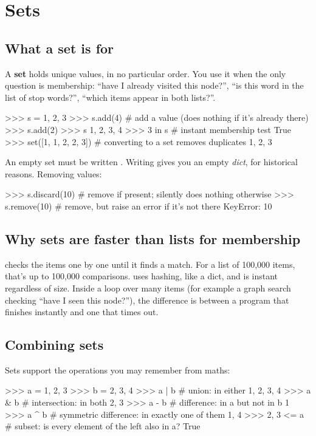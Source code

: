 \documentclass[10pt,a4paper]{article}
\begin{document}
\section{Sets}
\subsection{What a set is for}
A \textbf{set} holds unique values, in no particular order. You use it when the only question is membership: “have I already visited this node?”, “is this word in the list of stop words?”, “which items appear in both lists?”.
\begin{txtcode}
>>> s = {1, 2, 3}
>>> s.add(4)                 # add a value (does nothing if it's already there)
>>> s.add(2)
>>> s
{1, 2, 3, 4}
>>> 3 in s                   # instant membership test
True
>>> set([1, 1, 2, 2, 3])     # converting to a set removes duplicates
{1, 2, 3}
\end{txtcode}
An empty set must be written . Writing \code{\{\}} gives you an empty \emph{dict}, for historical reasons.
Removing values:
\begin{txtcode}
>>> s.discard(10)            # remove if present; silently does nothing otherwise
>>> s.remove(10)             # remove, but raise an error if it's not there
KeyError: 10
\end{txtcode}
\subsection{Why sets are faster than lists for membership}
 checks the items one by one until it finds a match. For a list of 100,000 items, that’s up to 100,000 comparisons.  uses hashing, like a dict, and is instant regardless of size. Inside a loop over many items (for example a graph search checking “have I seen this node?”), the difference is between a program that finishes instantly and one that times out.
\subsection{Combining sets}
Sets support the operations you may remember from maths:
\begin{txtcode}
>>> a = {1, 2, 3}
>>> b = {2, 3, 4}
>>> a | b        # union: in either
{1, 2, 3, 4}
>>> a & b        # intersection: in both
{2, 3}
>>> a - b        # difference: in a but not in b
{1}
>>> a ^ b        # symmetric difference: in exactly one of them
{1, 4}
>>> {2, 3} <= a  # subset: is every element of the left also in a?
True
\end{txtcode}
\end{document}
